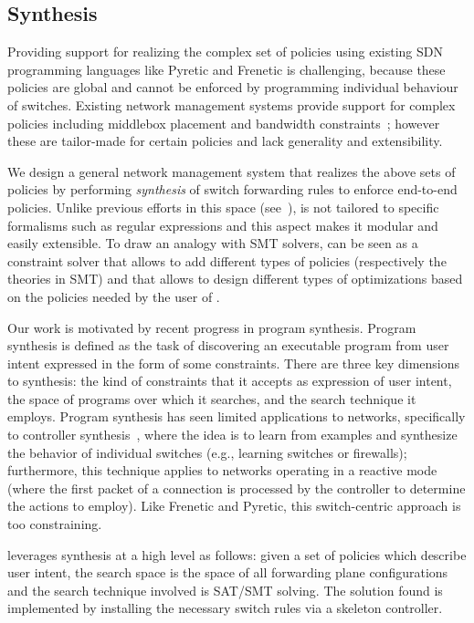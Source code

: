 \subsection{Synthesis} \label{sec:synthesis} 

Providing support for realizing the complex set of policies using
existing SDN programming languages like Pyretic and Frenetic is
challenging, because these policies are global and cannot be enforced
by programming individual behaviour of switches. Existing network
management systems provide support for complex policies including
middlebox placement and bandwidth constraints~\cite{}; however these
are tailor-made for certain policies and lack generality and
extensibility.

We design a general network management system that realizes the above
sets of policies by performing {\em synthesis} of switch forwarding
rules to enforce end-to-end policies. 
Unlike previous efforts in this space (see~\cite{}),
\Name is not tailored to 
specific formalisms such as regular expressions and
this aspect makes it modular  and easily extensible.
To draw an analogy with SMT solvers, 
\Name can be seen as a constraint solver
that allows to add different types of policies (respectively the theories in SMT) and
that allows to design different types of optimizations based on the 
policies needed by the user of \Name.

Our work is motivated by recent
progress in program synthesis. 
Program synthesis is defined as the task of discovering an executable
program from user intent expressed in the form of some
constraints. There are three key dimensions to synthesis: the kind of
constraints that it accepts as expression of user intent, the space of
programs over which it searches, and the search technique it
employs. Program synthesis has seen limited applications to networks,
specifically to controller synthesis~\cite{netegg}, where the idea is
to learn from examples and synthesize the behavior of individual
switches (e.g., learning switches or firewalls); furthermore, this
technique applies to networks operating in a reactive mode (where the
first packet of a connection is processed by the controller to
determine the actions to employ). Like Frenetic and Pyretic, this
switch-centric approach is too constraining.

\Name leverages synthesis at a high level as follows: given a set of
policies which describe user intent, the search space is the space of
all forwarding plane configurations and the search technique involved
is SAT/SMT solving. The solution found is implemented by installing
the necessary switch rules via a skeleton controller.

